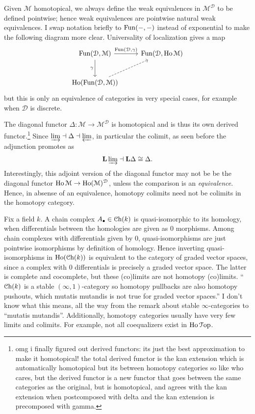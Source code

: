 \begin{remark}
	Given $\mathcal{M} $ homotopical, we always define the weak equivalences in $\mathcal{M} ^{\mathcal{D} } $ to be defined pointwise; hence weak equivalences are pointwise natural weak equivalences. I swap notation briefly to $\operatorname{Fun}(-,-)$ instead of exponential to make the following diagram more clear. Universality of localization gives a map
	\[\begin{tikzcd}[row sep = 2.5em, column sep = 2.5em]
	\Fun(\mathcal{D} ,\mathcal{M} )\ar[" \Fun(\mathcal{D} \text{,} \gamma) ", r] \ar[" \gamma "', d]  & \Fun(\mathcal{D} ,\Ho \mathcal{M} ) \\
	\Ho (\Fun(\mathcal{D} ,\mathcal{M} ))\ar[dashed, ur]  & 
	\end{tikzcd}\]
	but this is only an equivalence of categories in very special cases, for example when $\mathcal{D} $ is discrete.

	The diagonal functor $\Delta : \mathcal{M}  \to \mathcal{M} ^{\mathcal{D} } $ is homotopical and is thus its own derived functor.\footnote{omg i finally figured out derived functors: its just the best approximation to make it homotopical! the total derived functor is the kan extension which is automatically homotopical but its between homotopy categories so like who cares, but the derived functor is a new functor that goes between the same categories as the original, but is homotopical, and agrees with the kan extension when postcomposed with delta and the kan extension is precomposed with gamma.} Since $\varinjlim \dashv\Delta\dashv \varprojlim  $, in particular the colimit, as seen before the adjunction promotes as
	\[
		\mathbf{L} \varinjlim \dashv \mathbf{L} \Delta \cong \Delta
	.\]
	Interestingly, this adjoint version of the diagonal functor may not be be the diagonal functor $\operatorname{Ho} \mathcal{M} \to \operatorname{Ho} (\mathcal{M} )^\mathcal{D} $, unless the comparison is an \emph{equivalence}. Hence, in absense of an equivalence, homotopy colimits need not be colimits in the homotopy category.
\end{remark}

Fix a field $k$. A chain complex $A_{\bullet} \in \mathcal{C}\mathrm{h}(k)$ is quasi-isomorphic to its homology, when differentials between the homologies are given as 0 morphisms. Among chain complexes with differentials given by 0, quasi-isomorphisms are just pointwise isomorphisms by definition of homology. Hence inverting quasi-isomorphisms in $\operatorname{Ho} (\mathcal{C}\mathrm{h} (k))$ is equivalent to the category of graded vector spaces, since a complex with 0 differentials is precisely a graded vector space. The latter is complete and cocomplete, but these (co)limits are not homotopy (co)limits. ``$\mathcal{C}\mathrm{h}(k)$ is a stable $(\infty ,1)$-category so homotopy pullbacks are also homotopy pushouts, which mutatis mutandis is not true for graded vector spaces.'' I don't know what this means, all the way from the remark about stable $\infty $-categories to ``mutatis mutandis''. Additionally, homotopy categories usually have very few limits and colimits. For example, not all coequalizers exist in $\operatorname{Ho} \mathcal{T}\mathrm{op} $.

